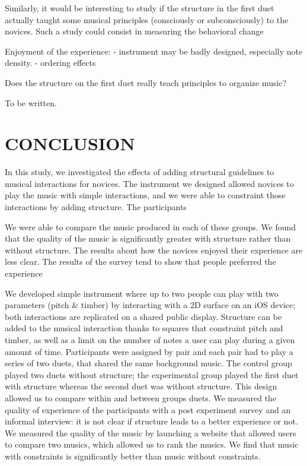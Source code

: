 \documentclass{article}
\begin{document}
Similarly, it would be interesting to study if the structure in the first duet actually taught some musical principles (consciously or subconsciously) to the novices. Such a study could consist in measuring the behavioral change 



Enjoyment of the experience:
- instrument may be badly designed, especially note density.
- ordering effects

Does the structure on the first duet really teach principles to organize music? 

To be written.




\section{CONCLUSION}

In this study, we investigated the effects of adding structural guidelines to musical interactions for novices. The instrument we designed allowed novices to play the music with simple interactions, and we were able to constraint those interactions by adding structure. The participants 

We were able to compare the music produced in each of these groups. We found that the quality of the music is significantly greater with structure rather than without structure. The results about how the novices enjoyed their experience are less clear. The results of the survey tend to show that people preferred the experience 

We developed simple instrument where up to two people can play with two parameters (pitch \& timber) by interacting with a 2D surface on an iOS device; both interactions are replicated on a shared public display. Structure can be added to the musical interaction thanks to squares that constraint pitch and timber, as well as a limit on the number of notes a user can play during a given amount of time. Participants were assigned by pair and each pair had to play a series of two duets, that shared the same background music. The control group played two duets without structure; the experimental group played the first duet with structure whereas the second duet was without structure. This design allowed us to compare within and between groups duets. We measured the quality of experience of the participants with a post experiment survey and an informal interview: it is not clear if structure leads to a better experience or not. We measured the quality of the music by launching a website that allowed users to compare two musics, which allowed us to rank the musics. We find that music with constraints is significantly better than music without constraints.
\end{document}
